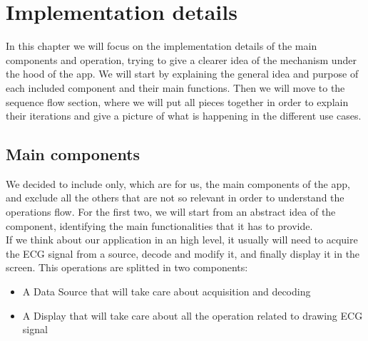 
\chapter{Implementation details}
\label{Chapter9}

In this chapter we will focus on the implementation details of the main components and operation, trying to give a clearer idea of the mechanism under the hood of the app. We will start by explaining the general idea and purpose of each included component and their main functions. Then we will move to the sequence flow section, where we will put all pieces together in order to explain their iterations and give a picture of what is happening in the different use cases.

\section{Main components}
We decided to include only, which are for us, the main components of the app, and exclude all the others that are not so relevant in order to understand the operations flow. For the first two, we will start from an abstract idea of the component, identifying the main functionalities that it has to provide.\\
If we think about our application in an high level, it usually will need to acquire the ECG signal from a source, decode and modify it, and finally display it in the screen. This operations are splitted in two components:
\begin{itemize}
	\item A Data Source that will take care about acquisition and decoding
	\item A Display that will take care about all the operation related to drawing ECG signal
\end{itemize}

